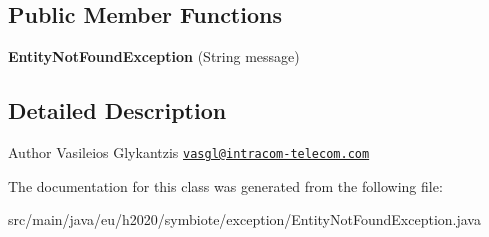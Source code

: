 \subsection*{Public Member Functions}
\begin{DoxyCompactItemize}
\item 
\mbox{\label{classeu_1_1h2020_1_1symbiote_1_1exception_1_1EntityNotFoundException_a3ac61b38a6d41a71faf6adc95b9d1d79}} 
{\bfseries Entity\+Not\+Found\+Exception} (String message)
\end{DoxyCompactItemize}


\subsection{Detailed Description}
\begin{DoxyAuthor}{Author}
Vasileios Glykantzis \href{mailto:vasgl@intracom-telecom.com}{\tt vasgl@intracom-\/telecom.\+com} 
\end{DoxyAuthor}


The documentation for this class was generated from the following file\+:\begin{DoxyCompactItemize}
\item 
src/main/java/eu/h2020/symbiote/exception/Entity\+Not\+Found\+Exception.\+java\end{DoxyCompactItemize}
